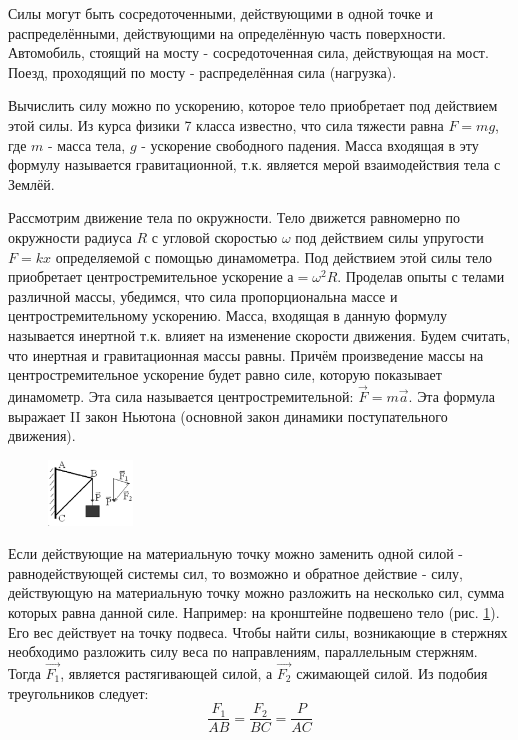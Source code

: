 \documentclass[a6paper, 11pt]{diss_4}
\renewcommand{\'}{\,'}
\begin{document}
  Силы могут быть сосредоточенными, действующими в одной точке и
распределёнными, действующими на определённую часть поверхности. Автомобиль,
стоящий на мосту - сосредоточенная сила, действующая на мост. Поезд, проходящий
по мосту - распределённая сила (нагрузка).

  Вычислить силу можно по ускорению, которое тело приобретает под действием
этой силы. Из курса физики 7 класса известно, что сила тяжести равна $F=mg$,
где $m$ - масса тела, $g$ - ускорение свободного падения. Масса входящая в
эту формулу называется гравитационной, т.к. является мерой взаимодействия
тела с Землёй.

  Рассмотрим движение тела по окружности. Тело движется равномерно по
окружности радиуса $R$ с угловой скоростью $\omega$ под действием силы
упругости $F=kx$ определяемой с помощью динамометра. Под действием этой силы
тело приобретает центростремительное ускорение $а=\omega^2R$. Проделав опыты с
 телами различной массы, убедимся, что сила пропорциональна массе и
центростремительному ускорению. Масса, входящая в данную формулу называется
инертной т.к. влияет на изменение скорости движения. Будем считать, что
инертная и гравитационная массы равны. Причём произведение массы на
центростремительное ускорение будет равно силе, которую показывает
динамометр. Эта сила называется центростремительной: $\vec{F}=m\vec{a}$. Эта
формула выражает II закон Ньютона (основной закон динамики поступательного
движения).

\begin{figure}
\includegraphics[width=0.2\textwidth]{img/ris_26.eps}
\caption{}
\label{r26}
\end{figure}
  Если действующие на материальную точку можно заменить одной силой -
равнодействующей системы сил, то возможно и обратное действие - силу,
действующую на материальную точку можно разложить на несколько сил, сумма
которых равна данной силе. Например: на кронштейне подвешено тело (рис. \ref{r26}). Его вес
действует на точку подвеса. Чтобы найти силы, возникающие в стержнях необходимо
разложить силу веса по направлениям, параллельным стержням. Тогда $\vec{F_1}$, является
растягивающей силой, а $\vec{F_2}$ сжимающей силой. Из подобия треугольников следует:
\[
\frac{F_1}{AB}=\frac{F_2}{BC}=\frac{P}{AC}
\]
\end{document}
